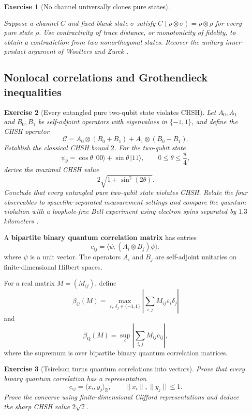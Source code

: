 \documentclass{article}
\newtheorem{exercise}{Exercise}
\begin{document}
\begin{exercise}[No channel universally clones pure states]
\label{ex:no-cloning}\leavevmode\par
\textit{Suppose a channel $C$ and fixed blank state $\sigma$ satisfy
$C(\rho\otimes\sigma)=\rho\otimes\rho$ for every pure state $\rho$. Use
contractivity of trace distance, or monotonicity of fidelity, to obtain a
contradiction from two nonorthogonal states. Recover the unitary inner-product
argument of Wootters and Zurek \cite{wootters-zurek}.}
\end{exercise}

\subsection{Nonlocal correlations and Grothendieck inequalities}

\begin{exercise}[Every entangled pure two-qubit state violates CHSH]\leavevmode\par
\textit{Let $A_0,A_1$ and $B_0,B_1$ be self-adjoint operators with
eigenvalues in $\{-1,1\}$, and define the CHSH operator}
\[
\mathcal C=A_0\otimes(B_0+B_1)+A_1\otimes(B_0-B_1).
\]
\textit{Establish the classical CHSH bound $2$. For the two-qubit state}
\[
\psi_\theta=\cos\theta\,|00\rangle+\sin\theta\,|11\rangle,
\qquad 0\leq\theta\leq\frac\pi4,
\]
\textit{derive the maximal CHSH value} \cite{gisin}
\[
2\sqrt{1+\sin^2(2\theta)}.
\]
\textit{Conclude that every entangled pure two-qubit state violates
CHSH. Relate the four observables to spacelike-separated measurement settings
and compare the quantum violation with a loophole-free Bell experiment using
electron spins separated by $1.3$ kilometers \cite{hensen-bell}.}
\end{exercise}

A \textbf{bipartite binary quantum correlation matrix} has entries
\[
c_{ij}=\langle\psi,(A_i\otimes B_j)\psi\rangle,
\]
where $\psi$ is a unit vector. The operators $A_i$ and $B_j$ are self-adjoint unitaries on finite-dimensional Hilbert spaces.

For a real matrix $M=(M_{ij})$, define
\[
\beta_{\mathrm C}(M)
=\max_{\varepsilon_i,\delta_j\in\{-1,1\}}
\left|\sum_{i,j}M_{ij}\varepsilon_i\delta_j\right|
\]
and
\[
\beta_{\mathrm Q}(M)
=\sup_c\left|\sum_{i,j}M_{ij}c_{ij}\right|,
\]
where the supremum is over bipartite binary quantum correlation matrices.

\begin{exercise}[Tsirelson turns quantum correlations into vectors]
\leavevmode\par
\textit{Prove that every binary quantum correlation has a representation}
\cite{tsirelson}
\[
c_{ij}=\langle x_i,y_j\rangle_{\mathbb R},
\qquad
\|x_i\|,\|y_j\|\leq1.
\]
\textit{Prove the converse using finite-dimensional Clifford
representations and deduce the sharp CHSH value $2\sqrt2$.}
\end{exercise}
\end{document}
